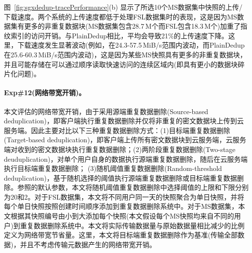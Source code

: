 图~\ref{fig:sgxdedup-tracePerformance}(b) 显示了所选10个MS数据集中快照的上传/下载速度。两个系统的上传速度都低于处理FSL数据集时的表现，这是因为MS数据集有更多的非重复数据块(MS数据集包含28.7\,M个而FSL包含18.3\,M个)加重了指纹索引的访问开销。与PlainDedup相比，\sysnameS 平均会导致21\%的上传速度下降。这里，下载速度发生显著波动(例如，\sysnameS 在24.3-57.5\,MiB/s范围内波动，而PlainDedup在25.6-60.3\,MiB/s范围内波动)，这是因为某些MS快照具有更多的非重复数据块，并且可能存储在可以通过顺序读取快速访问的连续区域内(即具有更小的数据块碎片化问题\cite{lillibridge13})。

\paragraph*{Exp\#12(网络带宽开销)。} 本文评估\sysnameS 的网络带宽开销，由于\sysnameS 采用源端重复数据删除(Source-based deduplication)，即客户端执行重复数据删除并仅将非重复的密文数据块上传到云服务端。因此主要对比以下三种重复数据删除方式：(1)目标端重复数据删除(Target-based deduplication)，即客户端上传所有密文数据块到云服务端，云服务端对收到的密文数据块执行重复数据删除；(2)两阶段重复数据删除(Two-stage deuduplication)\cite{li15}，对单个用户自身的数据执行源端重复数据删除，随后在云服务端执行目标端重复数据删除； (3)随机阈值重复数据删除(Random-threshold deduplication)\cite{harnik2010side}，基于随机选择的阈值执行源端重复数据删除或目标端重复数据删除。参照\cite{harnik2010side}的默认参数，本文将随机阈值重复数据删除中选择阈值的上限和下限分别为20和2。对于FSL数据集，本文将不同用户同一天的快照聚合为单日快照，并将每个单日快照按照创建时间顺序添加到重复数据删除系统中。对于MS数据集，本文根据其快照编号由小到大添加每个快照(本文假设每个MS快照均来自不同的用户)到重复数据删除系统中。本文将实际传输数据量与原始数据量相比减少的比例定义为网络带宽节省量。这里，本文将目标端重复数据删除作为基准(传输全部数据)，并且不考虑传输元数据产生的网络带宽开销。


